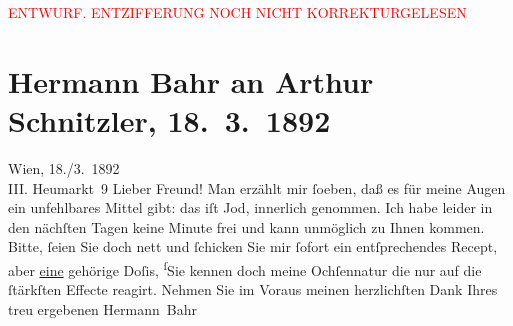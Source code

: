 
\begin{center}
            \textcolor{red}{ENTWURF. ENTZIFFERUNG NOCH NICHT KORREKTURGELESEN}
                      \end{center}
            
               \section[Hermann Bahr an Arthur Schnitzler, 18. 3. 1892]{ Hermann Bahr an Arthur Schnitzler, 18. 3. 1892}\nopagebreak{}\rehead{ }\begin{ledgroupsized}[t]{13cm}\normalsize\beginnumbering{} \toendnotes[C]{\smallbreak\pagebreak[2]} 
\pstart
           \raggedleft{}{\pb}Wien, 18./3. 1892{\\}III. Heumarkt 9\pend
           \pstart{}Lieber Freund!\pend\pstart
           Man erzählt mir ſoeben, daß es für meine Augen ein unfehlbares Mittel gibt: das iſt
               Jod, innerlich genommen. Ich habe leider in den nächſten Tagen keine Minute frei und
               kann unmöglich zu Ihnen kommen. Bitte, ſeien Sie doch nett und ſchicken Sie mir
               ſofort ein entſprechendes Recept, aber \uline{eine}{ }{\pb}gehörige Doſis, \substVorne{}\textsuperscript{ſ}\substDazwischen{}S\substHinten{}ie kennen doch meine \label{LL153-1v}Ochſennatur\label{LL153-1h} die nur auf die ſtärkſten Effecte reagirt. Nehmen Sie im
               Voraus meinen herzlichſten Dank Ihres treu ergebenen\pend
           \pstart \spacefill\mbox{Hermann Bahr}\pend{}\endnumbering{}\end{ledgroupsized}  \newcommand{\dateiname}{L00084}\newcommand{\titel}{Hermann Bahr an Arthur Schnitzler, 18. 3. 1892}\newcommand{\editorInnen}{ Kurt Ifkovits,  Martin Anton Müller}
      